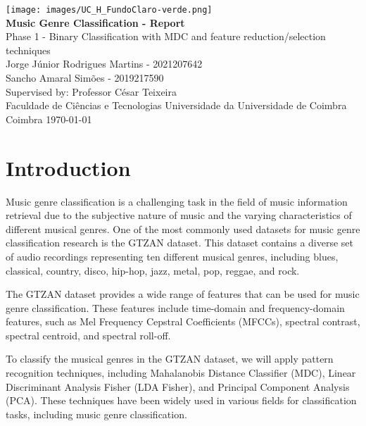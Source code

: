 \documentclass[12pt, a4paper]{article}
\newcommand{\university}{
Faculdade de Ciências e Tecnologias
Universidade da Universidade de Coimbra}
\newcommand{\logo}{\texttt{[image: images/UC\_H\_FundoClaro-verde.png]}}
\newcommand{\titletext}{Music Genre Classification - Report}
\newcommand{\authorone}{Jorge Júnior Rodrigues Martins - 2021207642}
\newcommand{\authortwo}{Sancho Amaral Simões - 2019217590}
\newcommand{\professor}{Professor César Teixeira}
\newcommand{\dateinfo}{\today} %
\begin{document}
\begin{titlepage}
\begin{center}
\logo \\
\vspace{2cm} %
{\huge \bf \titletext} \\
\vspace{1cm} %
{\large Phase 1 - Binary Classification with MDC and feature reduction/selection techniques} \\
\vspace{2cm} %
{\large \authorone} \\
{\large \authortwo} \\
\vspace{0.5cm} %
{\large Supervised by: \professor} \\
\vspace{4cm} %
{\large \university} \\
\vspace{3cm} 
{\small Coimbra \dateinfo}
\end{center}
\end{titlepage}

\tableofcontents
\newpage

\section{Introduction}

Music genre classification is a challenging task in the field of music information retrieval due to the subjective nature of music and the varying characteristics of different musical genres. One of the most commonly used datasets for music genre classification research is the GTZAN dataset. This dataset contains a diverse set of audio recordings representing ten different musical genres, including blues, classical, country, disco, hip-hop, jazz, metal, pop, reggae, and rock.

The GTZAN dataset provides a wide range of features that can be used for music genre classification. These features include time-domain and frequency-domain features, such as Mel Frequency Cepstral Coefficients (MFCCs), spectral contrast, spectral centroid, and spectral roll-off.

To classify the musical genres in the GTZAN dataset, we will apply pattern recognition techniques, including Mahalanobis Distance Classifier (MDC), Linear Discriminant Analysis Fisher (LDA Fisher), and Principal Component Analysis (PCA). These techniques have been widely used in various fields for classification tasks, including music genre classification.
\end{document}
